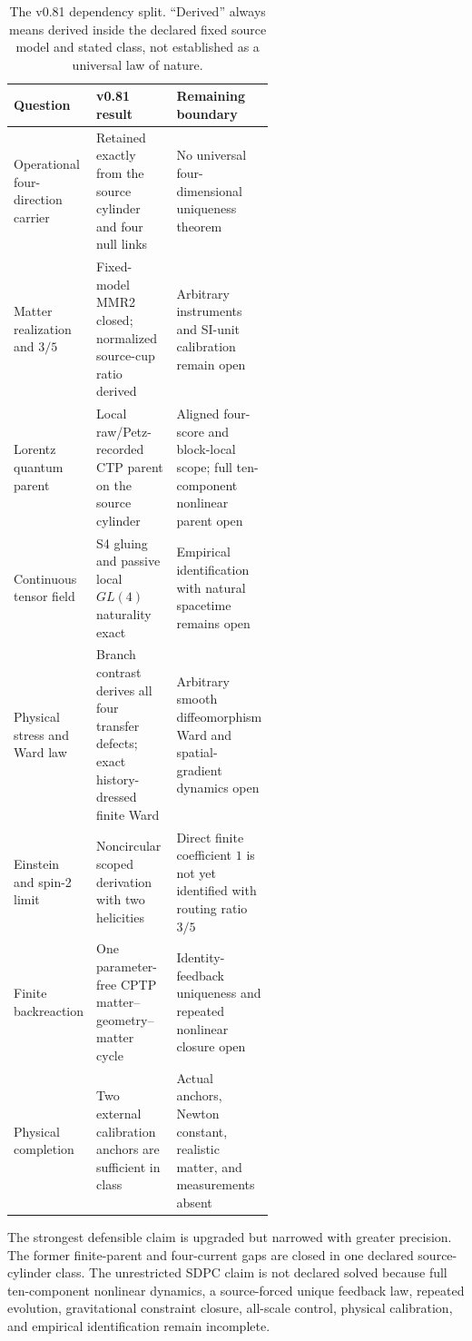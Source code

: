 \documentclass[11pt]{article}
\theoremstyle{definition}
\theoremstyle{remark}
\begin{document}
\begin{table}[ht]
\centering
\small
\begin{tabularx}{\linewidth}{>{\raggedright\arraybackslash}p{0.26\linewidth} >{\raggedright\arraybackslash}p{0.31\linewidth} X}
\toprule
Question & v0.81 result & Remaining boundary \\
\midrule
Operational four-direction carrier & Retained exactly from the source cylinder and four null links & No universal four-dimensional uniqueness theorem \\
Matter realization and $3/5$ & Fixed-model MMR2 closed; normalized source-cup ratio derived & Arbitrary instruments and SI-unit calibration remain open \\
Lorentz quantum parent & Local raw/Petz-recorded CTP parent on the source cylinder & Aligned four-score and block-local scope; full ten-component nonlinear parent open \\
Continuous tensor field & S4 gluing and passive local $GL(4)$ naturality exact & Empirical identification with natural spacetime remains open \\
Physical stress and Ward law & Branch contrast derives all four transfer defects; exact history-dressed finite Ward & Arbitrary smooth diffeomorphism Ward and spatial-gradient dynamics open \\
Einstein and spin-2 limit & Noncircular scoped derivation with two helicities & Direct finite coefficient $1$ is not yet identified with routing ratio $3/5$ \\
Finite backreaction & One parameter-free CPTP matter--geometry--matter cycle & Identity-feedback uniqueness and repeated nonlinear closure open \\
Physical completion & Two external calibration anchors are sufficient in class & Actual anchors, Newton constant, realistic matter, and measurements absent \\
\bottomrule
\end{tabularx}
\caption{The v0.81 dependency split. ``Derived'' always means derived inside the declared fixed source model and stated class, not established as a universal law of nature.}
\label{tab:delta}
\end{table}

The strongest defensible claim is upgraded but narrowed with greater precision. The former finite-parent and four-current gaps are closed in one declared source-cylinder class. The unrestricted SDPC claim is not declared solved because full ten-component nonlinear dynamics, a source-forced unique feedback law, repeated evolution, gravitational constraint closure, all-scale control, physical calibration, and empirical identification remain incomplete.
\end{document}

